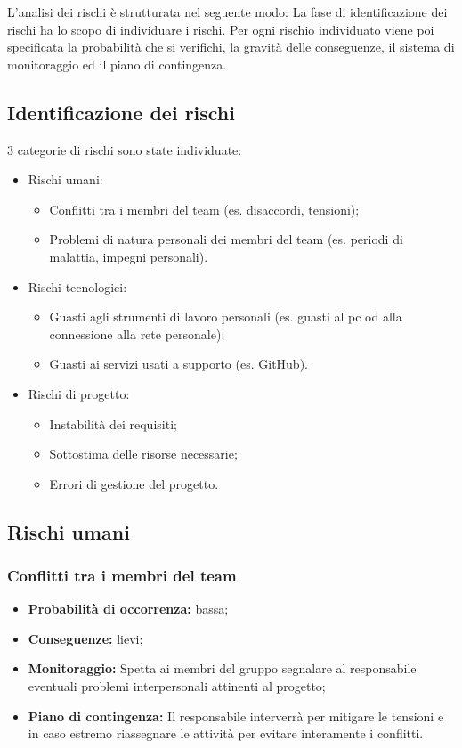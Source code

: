 L'analisi dei rischi è strutturata nel seguente modo:
La fase di identificazione dei rischi ha lo scopo di individuare i rischi.
Per ogni rischio individuato viene poi specificata la probabilità che si verifichi,
la gravità delle conseguenze, il sistema di monitoraggio ed il piano di contingenza.
\subsection{Identificazione dei rischi}
3 categorie di rischi sono state individuate:
\begin{itemize}
\item Rischi umani:
	\begin{itemize}
	\item Conflitti tra i membri del team (es. disaccordi, tensioni);
	\item Problemi di natura personali dei membri del team (es. periodi di malattia, impegni personali).
	\end{itemize}
\item Rischi tecnologici:
	\begin{itemize}
	\item Guasti agli strumenti di lavoro personali (es. guasti al pc od alla connessione alla rete personale);
	\item Guasti ai servizi usati a supporto (es. GitHub).
	\end{itemize}
\item Rischi di progetto:
	\begin{itemize}
	\item Instabilità dei requisiti;
	\item Sottostima delle risorse necessarie;
	\item Errori di gestione del progetto.
	\end{itemize}
\end{itemize}
\subsection{Rischi umani}
\subsubsection{Conflitti tra i membri del team}
\begin{itemize}
\item \textbf{Probabilità di occorrenza:} bassa;
\item \textbf{Conseguenze:} lievi;
\item \textbf{Monitoraggio:} Spetta ai membri del gruppo segnalare al responsabile eventuali problemi interpersonali attinenti al progetto;
\item \textbf{Piano di contingenza:} Il responsabile interverrà per mitigare le tensioni e in caso estremo riassegnare le attività per evitare interamente i conflitti.
\end{itemize}
